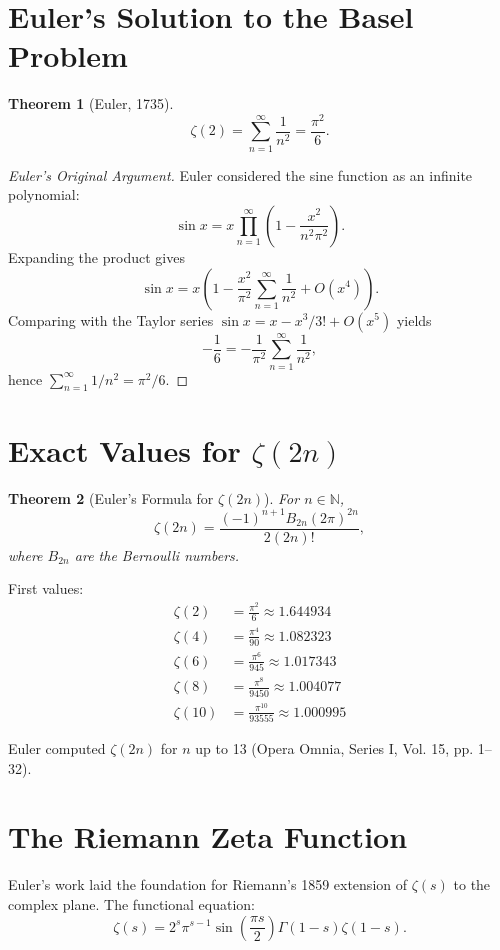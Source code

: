 \documentclass[11pt,a4paper,twoside]{book}
\theoremstyle{eulerstyle}
\newtheorem{theorem}{Theorem}[chapter]
\theoremstyle{definition}
\newcommand{\N}{\mathbb{N}}
\begin{document}
\section{Euler's Solution to the Basel Problem}

\begin{theorem}[Euler, 1735]
\[
\zeta(2) = \sum_{n=1}^\infty \frac{1}{n^2} = \frac{\pi^2}{6}.
\]
\end{theorem}

\begin{proof}[Euler's Original Argument]
Euler considered the sine function as an infinite polynomial:
\[
\sin x = x \prod_{n=1}^\infty \left(1 - \frac{x^2}{n^2 \pi^2}\right).
\]
Expanding the product gives
\[
\sin x = x \left(1 - \frac{x^2}{\pi^2}\sum_{n=1}^\infty \frac{1}{n^2} + O(x^4)\right).
\]
Comparing with the Taylor series $\sin x = x - x^3/3! + O(x^5)$ yields
\[
-\frac{1}{6} = -\frac{1}{\pi^2} \sum_{n=1}^\infty \frac{1}{n^2},
\]
hence $\sum_{n=1}^\infty 1/n^2 = \pi^2/6$.
\end{proof}

\section{Exact Values for $\zeta(2n)$}

\begin{theorem}[Euler's Formula for $\zeta(2n)$]
For $n \in \N$,
\[
\zeta(2n) = \frac{(-1)^{n+1} B_{2n} (2\pi)^{2n}}{2(2n)!},
\]
where $B_{2n}$ are the Bernoulli numbers.
\end{theorem}

First values:
\begin{align*}
\zeta(2)  &= \frac{\pi^2}{6} \approx 1.644934 \\
\zeta(4)  &= \frac{\pi^4}{90} \approx 1.082323 \\
\zeta(6)  &= \frac{\pi^6}{945} \approx 1.017343 \\
\zeta(8)  &= \frac{\pi^8}{9450} \approx 1.004077 \\
\zeta(10) &= \frac{\pi^{10}}{93555} \approx 1.000995
\end{align*}

Euler computed $\zeta(2n)$ for $n$ up to 13 (Opera Omnia, Series I, Vol. 15, pp. 1--32).

\section{The Riemann Zeta Function}

Euler's work laid the foundation for Riemann's 1859 extension of $\zeta(s)$ to the complex plane. The functional equation:
\[
\zeta(s) = 2^s \pi^{s-1} \sin\left(\frac{\pi s}{2}\right) \Gamma(1-s) \zeta(1-s).
\]
\end{document}
